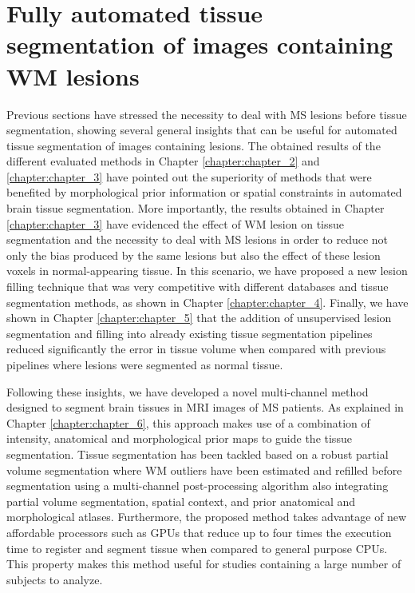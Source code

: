 \section{Fully automated tissue segmentation of images containing WM lesions}
\label{sec:label}

Previous sections have stressed the necessity to deal with MS lesions before tissue segmentation, showing several general insights that can be useful for automated tissue segmentation of images containing lesions. The obtained results of the different evaluated methods in Chapter \ref{chapter:chapter_2} and \ref{chapter:chapter_3} have pointed out the superiority of methods that were benefited by morphological prior information or spatial constraints in automated brain tissue segmentation. More importantly, the results obtained in Chapter \ref{chapter:chapter_3} have evidenced the effect of WM lesion on tissue segmentation and the necessity to deal with MS lesions in order to reduce not only the bias produced by the same lesions but also the effect of these lesion voxels in normal-appearing tissue. In this scenario, we have proposed a new lesion filling technique that was very competitive with different databases and tissue segmentation methods, as shown in Chapter \ref{chapter:chapter_4}. Finally, we have shown in Chapter \ref{chapter:chapter_5} that the addition of unsupervised lesion segmentation and filling into already existing tissue segmentation pipelines reduced significantly the error in tissue volume when compared with previous pipelines where lesions were segmented as normal tissue. 

Following these insights, we have developed a novel multi-channel method designed to segment brain tissues in MRI images of MS patients. As explained in Chapter \ref{chapter:chapter_6}, this approach makes use of a combination of intensity, anatomical and morphological prior maps to guide the tissue segmentation. Tissue segmentation has been tackled based on a robust partial volume segmentation where WM outliers have been estimated and refilled before segmentation using a multi-channel post-processing algorithm also integrating  partial volume segmentation, spatial context, and prior anatomical and morphological atlases. Furthermore, the proposed method takes advantage of new affordable processors such as GPUs that reduce up to four times the execution time to register and segment tissue when compared to general purpose CPUs. This property makes this method useful for studies containing a large number of subjects to analyze.   

